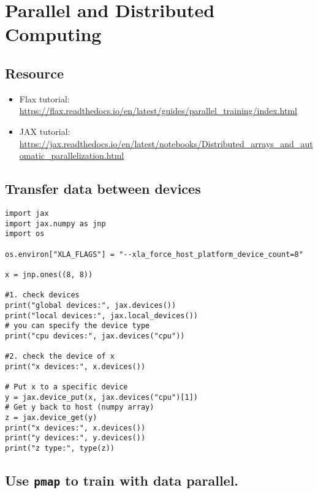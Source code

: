 \documentclass[11pt]{article}
\begin{document}
\section{Parallel and Distributed Computing}
\label{sec:orga00c272}

\subsection{Resource}
\label{sec:org2bfab64}

\begin{itemize}
\item Flax tutorial: \url{https://flax.readthedocs.io/en/latest/guides/parallel\_training/index.html}
\item JAX tutorial: \url{https://jax.readthedocs.io/en/latest/notebooks/Distributed\_arrays\_and\_automatic\_parallelization.html}
\end{itemize}
\subsection{Transfer data between devices}
\label{sec:orgbdfc8be}

\begin{verbatim}
import jax
import jax.numpy as jnp
import os

os.environ["XLA_FLAGS"] = "--xla_force_host_platform_device_count=8"

x = jnp.ones((8, 8))

#1. check devices
print("global devices:", jax.devices())
print("local devices:", jax.local_devices())
# you can specify the device type
print("cpu devices:", jax.devices("cpu"))

#2. check the device of x
print("x devices:", x.devices())

# Put x to a specific device
y = jax.device_put(x, jax.devices("cpu")[1])
# Get y back to host (numpy array)
z = jax.device_get(y)
print("x devices:", x.devices())
print("y devices:", y.devices())
print("z type:", type(z))
\end{verbatim}
\subsection{Use \texttt{pmap} to train with data parallel.}
\label{sec:org39d0cb6}
\end{document}
